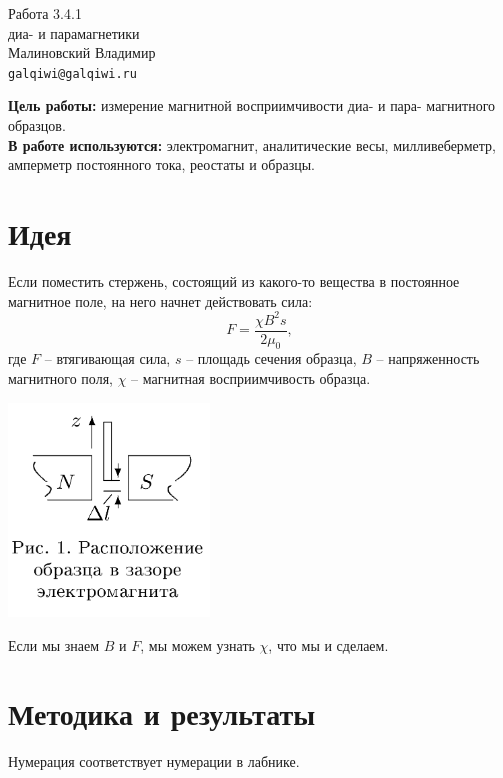 



\begin{center}
  \LARGE{Работа 3.4.1}\\[0.2cm]
  \LARGE{диа- и парамагнетики}\\[0.2cm]
  \large{Малиновский Владимир}\\[0.2cm]
  \normalsize{\texttt{galqiwi@galqiwi.ru}}
\end{center}

\textbf{Цель работы:} измерение магнитной восприимчивости диа- и пара- магнитного образцов.\\
\textbf{В работе используются:} электромагнит, аналитические весы, милливеберметр, амперметр постоянного тока, реостаты и образцы.\\
\section*{Идея}

Если поместить стержень, состоящий из какого-то вещества в постоянное магнитное поле, на него начнет действовать сила:
$$F = \frac{\chi B^2 s}{2\mu_0},$$
где $F$ -- втягивающая сила, $s$ -- площадь сечения образца, $B$ -- напряженность магнитного поля, $\chi$ -- магнитная восприимчивость образца.

\begin{center}
\includegraphics[width=0.40\textwidth]{1.png}
\end{center}

Если мы знаем $B$ и $F$, мы можем узнать $\chi$, что мы и сделаем.

\newpage
\section*{Методика и результаты}
Нумерация соответствует нумерации в лабнике.
